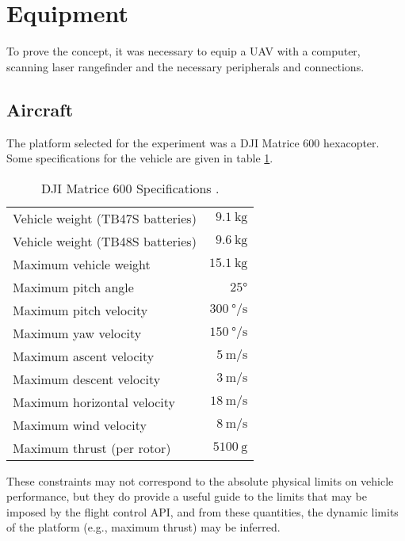 \label{chapter:Methods}

\section{Equipment}

To prove the concept, it was necessary to equip a UAV with a computer, scanning laser rangefinder and the necessary peripherals and connections.

\subsection{Aircraft}

The platform selected for the experiment was a DJI Matrice 600 hexacopter. Some specifications for the vehicle are given in table \ref{table:djispecs}.

\begin{table}
\begin{center}
\begin{tabular}{ l r }
\hline
Vehicle weight (TB47S batteries) & $\SI{9.1}\kg$ \\ 
Vehicle weight (TB48S batteries) & $\SI{9.6}\kg$ \\
Maximum vehicle weight & $\SI{15.1}\kg$ \\
Maximum pitch angle & $\ang{25}$ \\
Maximum pitch velocity & $\SI{300}{\degree\per\second}$ \\
Maximum yaw velocity & $\SI{150}{\degree\per\second}$ \\
Maximum ascent velocity & $\SI{5}{\metre\per\second}$ \\
Maximum descent velocity & $\SI{3}{\metre\per\second}$ \\
Maximum horizontal velocity & $\SI{18}{\metre\per\second}$ \\
Maximum wind velocity & $\SI{8}{\metre\per\second}$ \\
Maximum thrust (per rotor) & $\SI{5100}{\g}$ \\
\hline
\end{tabular}
\end{center}
\caption{DJI Matrice 600 Specifications \cite{DJI2017}.}
\label{table:djispecs}
\end{table}

These constraints may not correspond to the absolute physical limits on vehicle performance, but they do provide a useful guide to the limits that may be imposed by the flight control API, and from these quantities, the dynamic limits of the platform (e.g., maximum thrust) may be inferred.

